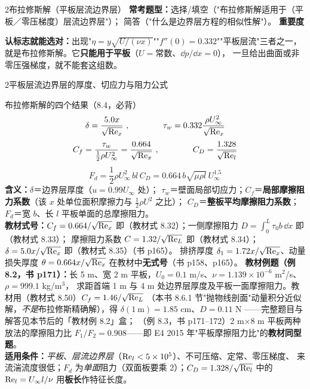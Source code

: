 \begin{kaodian}{2}{布拉修斯解（平板层流边界层）}
\textbf{常考题型：}选择/填空（"布拉修斯解适用于（平板／零压梯度）层流边界层"）；
简答（"什么是边界层方程的相似性解"）。
\textbf{重要度 }\quad{}\quad{}

\begin{banfa}
\textbf{认标志就能选对：}出现"$\eta=y\sqrt{U/(\nu x)}$""$f''(0)=0.332$""平板层流"三者之一，
就是布拉修斯解。它\textbf{只能用于平板}（$U=$常数、$\dd p/\dd x=0$），
一旦给出曲面或非零压强梯度，就不能套这组数。
\end{banfa}
\end{kaodian}

\begin{kaodian}{2}{平板层流边界层的厚度、切应力与阻力公式}
\begin{gongshi}{布拉修斯解的四个结果（8.4，必背）}
\[ \delta=\frac{5.0x}{\sqrt{\mathrm{Re}_x}}\ ,\qquad\qquad
   \tau_w=0.332\frac{\rho U_\infty^2}{\sqrt{\mathrm{Re}_x}} \]
\[ C_f=\frac{\tau_w}{\frac{1}{2}\rho U_\infty^2}=\frac{0.664}{\sqrt{\mathrm{Re}_x}}\ ,\qquad\qquad
   C_D=\frac{1.328}{\sqrt{\mathrm{Re}_l}} \]
\[ F_d=\frac{1}{2}\rho U_\infty^2\,bl\,C_D=0.664\,b\sqrt{\mu\rho l}\,U_\infty^{1.5} \]
\textbf{含义：}$\delta$＝边界层厚度（$u=0.99U_\infty$ 处）；
$\tau_w$＝壁面局部切应力；$C_f$＝\textbf{局部摩擦阻力系数}（该 $x$ 处单位面积摩擦力与 $\frac12\rho U^2$ 之比）；
$C_D$＝\textbf{整板平均摩擦阻力系数}；$F_d$＝宽 $b$、长 $l$ 平板单面的总摩擦阻力。\\
\textbf{教材式号：}$C_f=0.664/\sqrt{\mathrm{Re}_x}$ 即（教材式 8.32）；一侧摩擦阻力 $D=\int_0^L\tau_0b\,\dd x$ 即（教材式 8.33）；
摩擦阻力系数 $C=1.32/\sqrt{\mathrm{Re}_L}$ 即（教材式 8.34）；$\delta=5.0x/\sqrt{\mathrm{Re}_x}$ 即（教材式 8.35）（书 p165）。
排挤厚度 $\delta_1=1.72x/\sqrt{\mathrm{Re}_x}$、动量损失厚度 $\theta=0.664x/\sqrt{\mathrm{Re}_x}$ 在教材中\textbf{无式号}（书 p158、p165）。
\textbf{教材例题（例 8.2，书 p171）：}长 5 m、宽 2 m 平板，$U_0=0.1$ m/s、$\nu=1.139\times10^{-6}$ m$^2$/s、$\rho=999.1$ kg/m$^3$，
求距首端 1 m 与 4 m 处边界层厚度及平板一面摩擦阻力。教材用（教材式 8.50）$C_f=1.46/\sqrt{\mathrm{Re}_L}$
（本书 8.6.1 节"抛物线剖面"动量积分近似解，\emph{不是}布拉修斯精确解），得 $\delta(1\ \text{m})=1.85$ cm、$D=0.11$ N
——完整题目与解答见本节后的「教材例 8.2」盒；
（例 8.3，书 p171--172）2 m$\times$8 m 平板两种放法的摩擦阻力比 $F_1/F_2=0.908$——即 E4 2015 年"平板摩擦阻力比"的\textbf{教材同型题}。\\
\textbf{适用条件：}\emph{平板}、\emph{层流边界层}（$\mathrm{Re}_l<5\times10^5$）、不可压缩、定常、零压梯度、
来流湍流度很低；$F_d$ 为\emph{单面}阻力（双面板要乘 2）；$C_D=1.328/\sqrt{\mathrm{Re}_l}$ 中的
$\mathrm{Re}_l=U_\infty l/\nu$ 用\textbf{板长}作特征长度。
\end{gongshi}


\end{kaodian}
